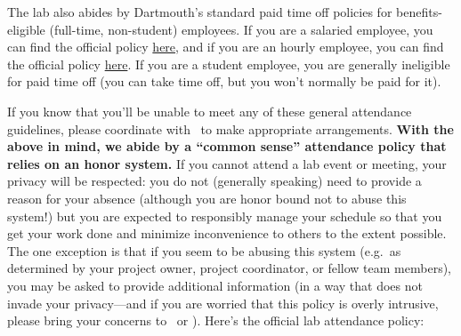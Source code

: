 \documentclass{tufte-book} %
\begin{document}
The lab also abides by Dartmouth's standard paid time off policies for
benefits-eligible (full-time, non-student) employees.  If you are a
salaried employee, you can find the official policy
\href{http://www.dartmouth.edu/~hrs/pdfs/paid_time_off_salaried.pdf}{here},
and if you are an hourly employee, you can find the official policy
\href{http://www.dartmouth.edu/~hrs/pdfs/Paid_Time_Off_Hourly.pdf}{here}.
If you are a student employee, you are generally ineligible for paid
time off (you can take time off, but you won't normally be paid for it).

If you know that you'll be unable to meet any of these general
attendance guidelines, please coordinate with \director~to make
appropriate arrangements.  \textbf{With the above in mind, we abide by
  a ``common sense'' attendance policy that relies on an honor
  system.}  If you
cannot attend a lab event or meeting, your privacy will be respected:
you do not (generally speaking) need to provide a reason for your
absence (although you are honor bound not to abuse this system!) but
you are expected to responsibly manage your schedule so that you get
your work done and minimize inconvenience to others to the extent
possible.  The one exception is that if you seem to be abusing this
system (e.g.\ as determined by your project owner, project
coordinator, or fellow team members), you may be asked to provide
additional information (in a way that does not invade your privacy---and
 if you are worried that this policy is overly intrusive, please
bring your concerns to \director~or \coordinator).  Here's the
official lab attendance policy:
\end{document}
